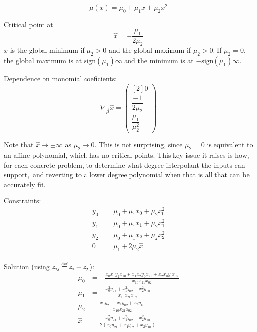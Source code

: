 
\begin{equation}
\mu(x) = \mu_0 + \mu_1 x + \mu_2 x^2
\end{equation}

Critical point at
\begin{equation}
\hat{x} = - \frac{\mu_1}{2 \mu_2}
\end{equation}
$\hat{x}$ is the global minimum if $\mu_2>0$ 
and the global maximum if $\mu_2>0$.
If $\mu_2 = 0$, the global maximum is at 
$\text{sign}(\mu_1)\infty$
and the minimum is at $-\text{sign}(\mu_1)\infty$.

Dependence on monomial coeficients:
\begin{equation}
\nabla_{\vec{\mu}} \hat{x} =
\begin{pmatrix}[2]
0 
\\
\dfrac{-1}{2 \mu_2} 
\\
\dfrac{\mu_1}{\mu_2^2}
\end{pmatrix}
\end{equation}

Note that $\hat{x} \to  \pm \infty$ as $\mu_2 \to 0$. 
This is not surprising, since $\mu_2 = 0$ is equivalent to
an affine polynomial, which has no critical points.
This key issue it raises is how, for each concrete problem,
to determine what degree interpolant the inputs can support,\
and reverting to a lower degree polynomial when that is all that
can be accurately fit.

\leveldown{Input: $(x_0,y_0), (x_1,y_1), (x_2,y_2)$}
\label{sec:monomial-yyy}

%

Constraints:
\begin{align}
y_0 & = \mu_0+\mu_1 x_0+\mu_2 x_0^{2}  
\\
y_1 & = \mu_0+\mu_1 x_1+\mu_2 x_1^{2}  
\nonumber 
\\
y_2 & = \mu_0+\mu_1 x_2+\mu_2 x_2^{2}  
\nonumber 
\\
0 & = \mu_1 + 2 \mu_2 \hat{x}  
\nonumber 
\end{align}

Solution (using $z_{ij} \operatorname*{\overset{\underset{\mathrm{def}}{}}{=}} z_i - z_j$):
\begin{align}
\mu_0 & =
- \frac{
x_0 x_1 y_2 x_{10}
+
x_1 x_2 y_0 x_{21}
+
x_2 x_0 y_1 x_{02}
}{
x_{10} x_{21} x_{02}
} 
\\
\mu_1 & =
- \frac{
x_0^{2} y_{21}
+ 
x_1^{2} y_{02} 
+
x_2^{2} y_{10}
}{
x_{10} x_{21} x_{02}
} 
\nonumber \\
\mu_2 & = 
\frac{
x_0 y_{21} 
+
x_1 y_{02}
+
x_2 y_{10} 
}{
x_{10} x_{21} x_{02}
 } 
\nonumber  \\ 
 \hat{x} & = 
\frac{
x_0^{2} y_{21} 
 +
x_1^{2} y_{02} 
 +
x_2^{2} y_{10} 
}{
2 \left(
x_0 y_{21} 
+ 
x_1 y_{02} 
+ 
x_2 y_{10}  
\right)
}
\nonumber 
\end{align}

